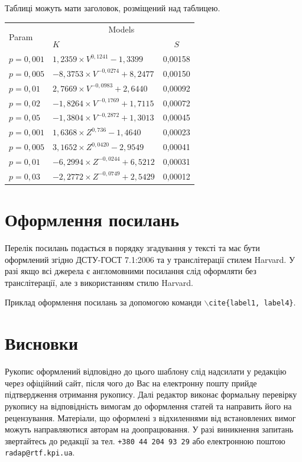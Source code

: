 \begin{multicols}{2}
Таблиці можуть мати заголовок, розміщений над таблицею. 
\begin{Table}
	\begin{tabularx}{\linewidth}{|l|X|c|}
		\hline 
		\multirow{2}{4em}{\rule{0pt}{11pt} Param} & \multicolumn{2}{c|}{\rule{0pt}{11pt} Models}\\ 
		\cline{2-3} 
		             & $K$ &  $S$\\ 
		\hline 
		\rule{0pt}{10pt}$p=0,001$& $1,2359\times V^{0,1241}-1,3399$ &  0,00158\\ 
		\hline 
		\rule{0pt}{10pt}$p=0,005$& $-8,3753\times V^{-0,0274}+8,2477$ &  0,00150\\ 
		\hline 
		\rule{0pt}{10pt}$p=0,01$&  $2,7669\times V^{-0,0983}+2,6440$&  0,00092\\ 
		\hline 
		\rule{0pt}{10pt}$p=0,02$&  $-1,8264\times V^{-0,1769}+1,7115$&  0,00072\\ 
		\hline 
		\rule{0pt}{10pt}$p=0,05$&  $-1,3804\times V^{-0,2872}+1,3013$&  0,00045\\ 
		\hline 
		\rule{0pt}{10pt}$p=0,001$&  $1,6368\times Z^{0,736}-1,4640$&  0,00023\\ 
		\hline 
		\rule{0pt}{10pt}$p=0,005$&  $3,1652\times Z^{0,0420}-2,9549$&  0,00041\\ 
		\hline 
		\rule{0pt}{10pt}$p=0,01$&  $-6,2994\times Z^{-0,0244}+6,5212$&  0,00031\\ 
		\hline 
		\rule{0pt}{10pt}$p=0,03$&  $-2,2772\times Z^{-0,0749}+2,5429$&  0,00012\\ 
		\hline 
	\end{tabularx} \label{radap1361tab1}
\end{Table}

\section{Оформлення посилань}

Перелік посилань подається в порядку згадування у тексті та має бути оформлений згідно ДСТУ-ГОСТ 7.1:2006 та у транслітерації стилем Harvard. У разі якщо всі джерела є англомовними посилання слід оформляти без транслітерації, але з використанням стилю Harvard.

Приклад оформлення посилань  \cite{ref1,ref4} за допомогою команди \texttt{$\backslash$cite\{label1, label4\}}. 



\section*{Висновки}
Рукопис оформлений відповідно до цього шаблону слід надсилати у редакцію через офіційний сайт, після чого до Вас на електронну пошту прийде підтвердження отримання рукопису. Далі редактор виконає формальну перевірку рукопису на відповідність вимогам до оформлення статей та направить його на рецензування. Матеріали, що оформлені з відхиленнями від встановлених вимог можуть направляютися авторам на доопрацювання. У разі виникнення запитань звертайтесь до редакції за тел. \texttt{+380 44 204 93 29} або електронною поштою \texttt{radap@rtf.kpi.ua}.




\end{multicols}
